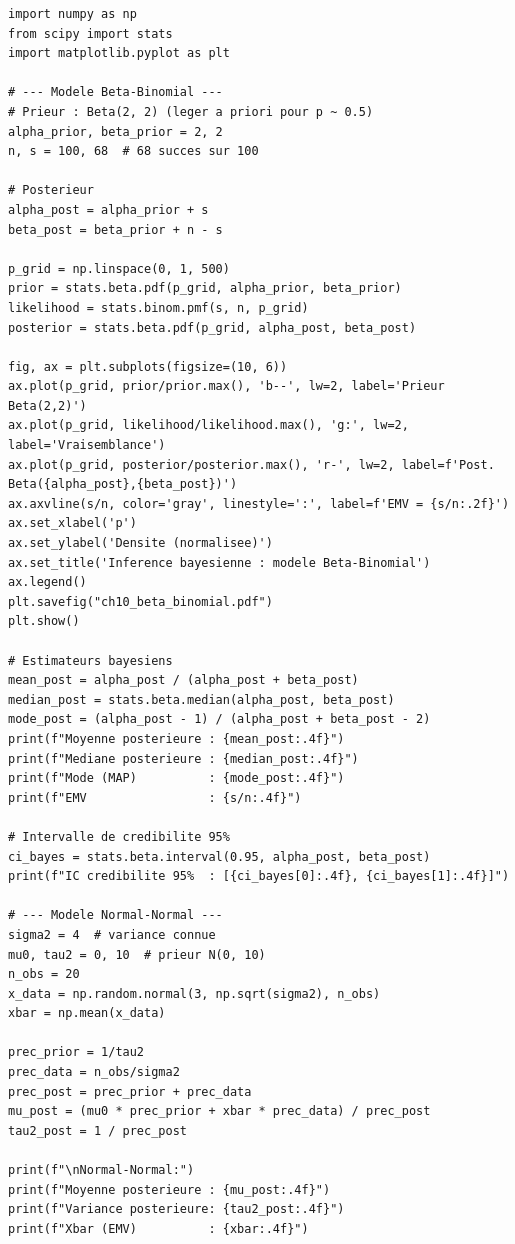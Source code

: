 \begin{python}
\begin{verbatim}
import numpy as np
from scipy import stats
import matplotlib.pyplot as plt

# --- Modele Beta-Binomial ---
# Prieur : Beta(2, 2) (leger a priori pour p ~ 0.5)
alpha_prior, beta_prior = 2, 2
n, s = 100, 68  # 68 succes sur 100

# Posterieur
alpha_post = alpha_prior + s
beta_post = beta_prior + n - s

p_grid = np.linspace(0, 1, 500)
prior = stats.beta.pdf(p_grid, alpha_prior, beta_prior)
likelihood = stats.binom.pmf(s, n, p_grid)
posterior = stats.beta.pdf(p_grid, alpha_post, beta_post)

fig, ax = plt.subplots(figsize=(10, 6))
ax.plot(p_grid, prior/prior.max(), 'b--', lw=2, label='Prieur Beta(2,2)')
ax.plot(p_grid, likelihood/likelihood.max(), 'g:', lw=2, label='Vraisemblance')
ax.plot(p_grid, posterior/posterior.max(), 'r-', lw=2, label=f'Post. Beta({alpha_post},{beta_post})')
ax.axvline(s/n, color='gray', linestyle=':', label=f'EMV = {s/n:.2f}')
ax.set_xlabel('p')
ax.set_ylabel('Densite (normalisee)')
ax.set_title('Inference bayesienne : modele Beta-Binomial')
ax.legend()
plt.savefig("ch10_beta_binomial.pdf")
plt.show()

# Estimateurs bayesiens
mean_post = alpha_post / (alpha_post + beta_post)
median_post = stats.beta.median(alpha_post, beta_post)
mode_post = (alpha_post - 1) / (alpha_post + beta_post - 2)
print(f"Moyenne posterieure : {mean_post:.4f}")
print(f"Mediane posterieure : {median_post:.4f}")
print(f"Mode (MAP)          : {mode_post:.4f}")
print(f"EMV                 : {s/n:.4f}")

# Intervalle de credibilite 95%
ci_bayes = stats.beta.interval(0.95, alpha_post, beta_post)
print(f"IC credibilite 95%  : [{ci_bayes[0]:.4f}, {ci_bayes[1]:.4f}]")

# --- Modele Normal-Normal ---
sigma2 = 4  # variance connue
mu0, tau2 = 0, 10  # prieur N(0, 10)
n_obs = 20
x_data = np.random.normal(3, np.sqrt(sigma2), n_obs)
xbar = np.mean(x_data)

prec_prior = 1/tau2
prec_data = n_obs/sigma2
prec_post = prec_prior + prec_data
mu_post = (mu0 * prec_prior + xbar * prec_data) / prec_post
tau2_post = 1 / prec_post

print(f"\nNormal-Normal:")
print(f"Moyenne posterieure : {mu_post:.4f}")
print(f"Variance posterieure: {tau2_post:.4f}")
print(f"Xbar (EMV)          : {xbar:.4f}")
\end{verbatim}
\end{python}

